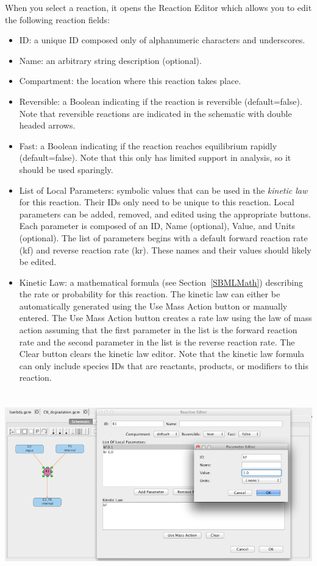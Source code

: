 \documentclass[titlepage,11pt]{article}
\begin{document}
When you select a reaction, it opens the Reaction Editor which allows you to edit the following reaction fields:
\begin{itemize}
\item ID: a unique ID composed only of alphanumeric characters and underscores.
\item Name: an arbitrary string description (optional).
\item Compartment: the location where this reaction takes place.
\item Reversible: a Boolean indicating if the reaction is reversible (default=false).  Note that reversible reactions are indicated in the schematic with double headed arrows.
\item Fast: a Boolean indicating if the reaction reaches equilibrium rapidly (default=false).  Note that this only has limited support in analysis, so it should be used sparingly.
\item List of Local Parameters: symbolic values that can be used in the \emph{kinetic law} for this reaction.  Their IDs only need to be unique to this reaction.  Local parameters can be added, removed, and edited using the appropriate buttons.  Each parameter is composed of an ID, Name (optional), Value, and Units (optional).  The list of parameters begins with a default forward reaction rate (kf) and reverse reaction rate (kr).  These names and their values should likely be edited. 
\item Kinetic Law: a mathematical formula (see Section~\ref{SBMLMath}) describing the rate or probability for this reaction.  The kinetic law can either be automatically generated using the Use Mass Action button or manually entered.  The Use Mass Action button creates a rate law using the law of mass action assuming that the first parameter in the list is the forward reaction rate and the second parameter in the list is the reverse reaction rate.  
The Clear button clears the kinetic law editor.  Note that the kinetic law formula can only include species IDs that are reactants, products, or modifiers to this reaction.
\end{itemize}

\begin{center}
\includegraphics[height=80mm]{screenshots/localParam}
\end{center}
\end{document}
